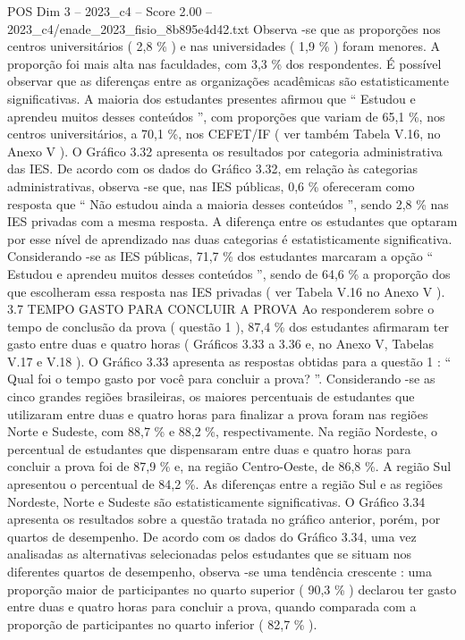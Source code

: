 \begin{textsample}{POS Dim 3 – 2023\_c4 – Score 2.00 – 2023\_c4/enade\_2023\_fisio\_8b895e4d42.txt}
Observa -se que as proporções nos centros universitários ( 2,8 \% ) e nas universidades ( 1,9 \% ) foram menores.
A proporção foi mais alta nas faculdades, com 3,3 \% dos respondentes.
É possível observar que as diferenças entre as organizações acadêmicas são estatisticamente significativas.
A maioria dos estudantes presentes afirmou que “ Estudou e aprendeu muitos desses conteúdos ”, com proporções que variam de 65,1 \%, nos centros universitários, a 70,1 \%, nos CEFET/IF ( ver também Tabela V.16, no Anexo V ).
O Gráfico 3.32 apresenta os resultados por categoria administrativa das IES.
De acordo com os dados do Gráfico 3.32, em relação às categorias administrativas, observa -se que, nas IES públicas, 0,6 \% ofereceram como resposta que “ Não estudou ainda a maioria desses conteúdos ”, sendo 2,8 \% nas IES privadas com a mesma resposta.
A diferença entre os estudantes que optaram por esse nível de aprendizado nas duas categorias é estatisticamente significativa.
Considerando -se as IES públicas, 71,7 \% dos estudantes marcaram a opção “ Estudou e aprendeu muitos desses conteúdos ”, sendo de 64,6 \% a proporção dos que escolheram essa resposta nas IES privadas ( ver Tabela V.16 no Anexo V ). 3.7 TEMPO GASTO PARA CONCLUIR A PROVA Ao responderem sobre o tempo de conclusão da prova ( questão 1 ), 87,4 \% dos estudantes afirmaram ter gasto entre duas e quatro horas ( Gráficos 3.33 a 3.36 e, no Anexo V, Tabelas V.17 e V.18 ).
O Gráfico 3.33 apresenta as respostas obtidas para a questão 1 : “ Qual foi o tempo gasto por você para concluir a prova? ”.
Considerando -se as cinco grandes regiões brasileiras, os maiores percentuais de estudantes que utilizaram entre duas e quatro horas para finalizar a prova foram nas regiões Norte e Sudeste, com 88,7 \% e 88,2 \%, respectivamente.
Na região Nordeste, o percentual de estudantes que dispensaram entre duas e quatro horas para concluir a prova foi de 87,9 \% e, na região Centro-Oeste, de 86,8 \%.
A região Sul apresentou o percentual de 84,2 \%.
As diferenças entre a região Sul e as regiões Nordeste, Norte e Sudeste são estatisticamente significativas.
O Gráfico 3.34 apresenta os resultados sobre a questão tratada no gráfico anterior, porém, por quartos de desempenho.
De acordo com os dados do Gráfico 3.34, uma vez analisadas as alternativas selecionadas pelos estudantes que se situam nos diferentes quartos de desempenho, observa -se uma tendência crescente : uma proporção maior de participantes no quarto superior ( 90,3 \% ) declarou ter gasto entre duas e quatro horas para concluir a prova, quando comparada com a proporção de participantes no quarto inferior ( 82,7 \% ).

\end{textsample}
